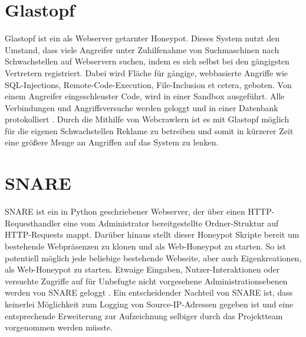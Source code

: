 \section{Glastopf}
\label{sec:Glastopf}

Glastopf ist ein als Webserver getarnter Honeypot. Dieses System nutzt den Umstand, dass viele Angreifer unter Zuhilfenahme von Suchmaschinen nach Schwachstellen auf Webservern suchen, indem es sich selbst bei den gängigsten Vertretern registriert. Dabei wird Fläche für gängige, webbasierte Angriffe wie SQL-Injections, Remote-Code-Execution, File-Inclusion et cetera, geboten. Von einem Angreifer eingeschleuster Code, wird in einer Sandbox ausgeführt. Alle Verbindungen und Angriffsversuche werden geloggt und in einer Datenbank protokolliert \cite{Glastopf16}. Durch die Mithilfe von Webcrawlern ist es mit Glastopf möglich für die eigenen Schwachstellen Reklame zu betreiben und somit in kürzerer Zeit eine größere Menge an Angriffen auf das System zu lenken. 

\section{SNARE}
\label{sec:SNARE}

SNARE ist ein in Python geschriebener Webserver, der über einen HTTP-Requesthandler eine vom Administrator bereitgestellte Ordner-Struktur auf HTTP-Requests mappt. Darüber hinaus stellt dieser Honeypot Skripte bereit um bestehende Webpräsenzen zu klonen und als Web-Honeypot zu starten. So ist potentiell möglich jede beliebige bestehende Webseite, aber auch Eigenkreationen, als Web-Honeypot zu starten. Etwaige Eingaben, Nutzer-Interaktionen oder versuchte Zugriffe auf für Unbefugte nicht vorgesehene Administrationsebenen werden von SNARE geloggt \cite{Snare16}. Ein entscheidender Nachteil von SNARE ist, dass keinerlei Möglichkeit zum Logging von Source-IP-Adressen gegeben ist und eine entsprechende Erweiterung zur Aufzeichnung selbiger durch das Projektteam vorgenommen werden müsste.\\
